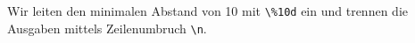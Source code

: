  
 Wir leiten den minimalen Abstand von 10 mit \lstinline{\%10d} ein und trennen die Ausgaben mittels Zeilenumbruch \lstinline{\n}.
 
 
